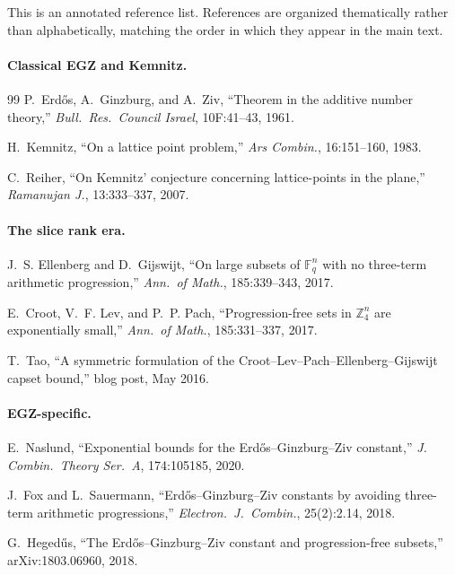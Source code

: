 \documentclass[11pt,a4paper]{article}
\theoremstyle{plain}
\theoremstyle{definition}
\theoremstyle{remark}
\newcommand{\F}{\mathbb{F}}
\newcommand{\Z}{\mathbb{Z}}
\begin{document}
This is an annotated reference list. References are organized thematically rather than alphabetically, matching the order in which they appear in the main text.

\paragraph{Classical EGZ and Kemnitz.}

\begin{thebibliography}{99}
P.~Erd\H{o}s, A.~Ginzburg, and A.~Ziv, ``Theorem in the additive number theory,'' \emph{Bull.\ Res.\ Council Israel}, 10F:41--43, 1961.

H.~Kemnitz, ``On a lattice point problem,'' \emph{Ars Combin.}, 16:151--160, 1983.

C.~Reiher, ``On Kemnitz' conjecture concerning lattice-points in the plane,'' \emph{Ramanujan J.}, 13:333--337, 2007.

\paragraph{The slice rank era.}

J.~S. Ellenberg and D.~Gijswijt, ``On large subsets of $\F_q^n$ with no three-term arithmetic progression,'' \emph{Ann.\ of Math.}, 185:339--343, 2017.

E.~Croot, V.~F. Lev, and P.~P. Pach, ``Progression-free sets in $\Z_4^n$ are exponentially small,'' \emph{Ann.\ of Math.}, 185:331--337, 2017.

T.~Tao, ``A symmetric formulation of the Croot--Lev--Pach--Ellenberg--Gijswijt capset bound,'' blog post, May 2016.

\paragraph{EGZ-specific.}

E.~Naslund, ``Exponential bounds for the Erd\H{o}s--Ginzburg--Ziv constant,'' \emph{J. Combin.\ Theory Ser.\ A}, 174:105185, 2020.

J.~Fox and L.~Sauermann, ``Erd\H{o}s--Ginzburg--Ziv constants by avoiding three-term arithmetic progressions,'' \emph{Electron.\ J.\ Combin.}, 25(2):2.14, 2018.

G.~Heged\H{u}s, ``The Erd\H{o}s--Ginzburg--Ziv constant and progression-free subsets,'' arXiv:1803.06960, 2018.


\end{thebibliography}
\end{document}
